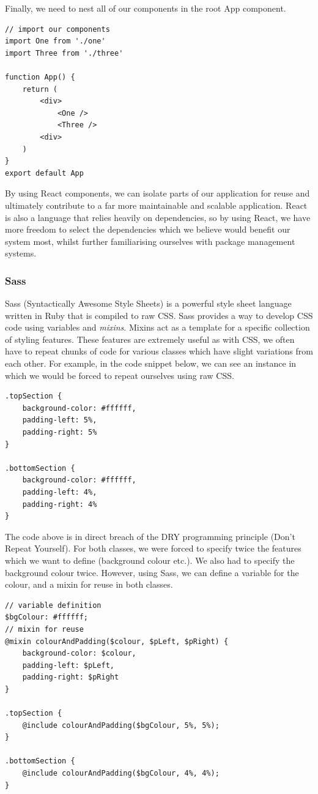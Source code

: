 Finally, we need to nest all of our components in the root App component. 

\begin{verbatim}
// import our components
import One from './one'
import Three from './three'

function App() {
    return (
        <div>
            <One />
            <Three />
        <div>
    )
}
export default App
\end{verbatim}

By using React components, we can isolate parts of our application for reuse and ultimately contribute to a far more maintainable and scalable application. React is also a language that relies heavily on dependencies, so by using React, we have more freedom to select the dependencies which we believe would benefit our system most, whilst further familiarising ourselves with package management systems.

\subsubsection{Sass}
Sass (Syntactically Awesome Style Sheets) is a powerful style sheet language written in Ruby that is compiled to raw CSS. \cite{sass} 
Sass provides a way to develop CSS code using variables and \textit{mixins}. Mixins act as a template for a specific collection of styling features. These features are extremely useful as with CSS, we often have to repeat chunks of code for various classes which have slight variations from each other. For example, in the code snippet below, we can see an instance in which we would be forced to repeat ourselves using raw CSS. 
\begin{verbatim}
.topSection {
    background-color: #ffffff,
    padding-left: 5%,
    padding-right: 5%
}

.bottomSection {
    background-color: #ffffff,
    padding-left: 4%,
    padding-right: 4%
}
\end{verbatim}

The code above is in direct breach of the DRY programming principle (Don't Repeat Yourself). For both classes, we were forced to specify twice the features which we want to define (background colour etc.). We also had to specify the background colour twice. However, using Sass, we can define a variable for the colour, and a mixin for reuse in both classes. 

\begin{verbatim}
// variable definition 
$bgColour: #ffffff;
// mixin for reuse 
@mixin colourAndPadding($colour, $pLeft, $pRight) {
    background-color: $colour,
    padding-left: $pLeft,
    padding-right: $pRight    
}

.topSection {
    @include colourAndPadding($bgColour, 5%, 5%);
}

.bottomSection {
    @include colourAndPadding($bgColour, 4%, 4%);
}
\end{verbatim}


